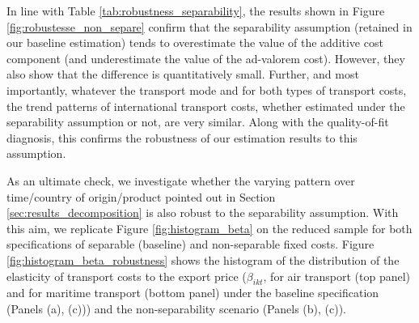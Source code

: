 \documentclass[a4paper,11pt]{article}
\begin{document}
In line with Table \ref{tab:robustness_separability}, the results shown in Figure \ref{fig:robustesse_non_separe} confirm that the separability assumption (retained in our baseline estimation) tends to overestimate the value of the additive cost component (and underestimate the value of the ad-valorem cost).
However, they also show that the difference is quantitatively small. Further, and most importantly, whatever the transport mode and for both types of transport costs, the trend patterns of international transport costs, whether estimated under the separability assumption or not, are very similar. Along with the quality-of-fit diagnosis, this confirms the robustness of our estimation results to this assumption.

As an ultimate check, we investigate whether the varying pattern over time/country of origin/product pointed out in Section \ref{sec:results_decomposition} is also robust to the separability assumption. With this aim, we replicate Figure \ref{fig:histogram_beta} on the reduced sample for both specifications of separable (baseline) and non-separable fixed costs.
Figure \ref{fig:histogram_beta_robustness} shows the histogram of the distribution of the elasticity of transport costs to the export price ($\beta_{ikt}$, for air transport (top panel) and for maritime transport (bottom panel) under the baseline specification (Panels (a), (c))) and the non-separability scenario (Panels (b), (c)).
\end{document}
